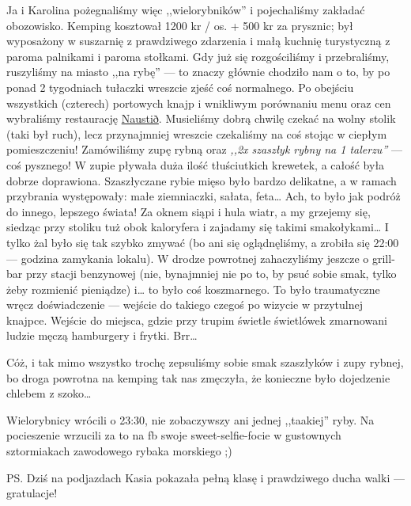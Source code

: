 
Ja i Karolina pożegnaliśmy więc ,,wielorybników'' i pojechaliśmy zakładać obozowisko. Kemping kosztował 1200 kr / os. + 500 kr za prysznic; był wyposażony w suszarnię z prawdziwego zdarzenia i małą kuchnię turystyczną z paroma palnikami i paroma stołkami. Gdy już się rozgościliśmy i przebraliśmy, ruszyliśmy na miasto ,,na rybę'' --- to znaczy głównie chodziło nam o to, by po ponad 2 tygodniach tułaczki wreszcie zjeść coś normalnego. Po obejściu wszystkich (czterech) portowych knajp i wnikliwym porównaniu menu oraz cen wybraliśmy restaurację \href{https://www.facebook.com/naustid}{Naustið}. Musieliśmy dobrą chwilę czekać na wolny stolik (taki był ruch), lecz przynajmniej wreszcie czekaliśmy na coś stojąc w ciepłym pomieszczeniu! Zamówiliśmy zupę rybną oraz \emph{,,2x szaszłyk rybny na 1 talerzu''} --- coś pysznego! W zupie pływała duża ilość tłuściutkich krewetek, a całość była dobrze doprawiona. Szaszłyczane rybie mięso było bardzo delikatne, a w ramach przybrania występowały: małe ziemniaczki, sałata, feta… Ach, to było jak podróż do innego, lepszego świata! Za oknem siąpi i hula wiatr, a my grzejemy się, siedząc przy stoliku tuż obok kaloryfera i zajadamy się takimi smakołykami… I tylko żal było się tak szybko zmywać (bo ani się oglądnęliśmy, a zrobiła się 22:00 --- godzina zamykania lokalu). W drodze powrotnej zahaczyliśmy jeszcze o grill-bar przy stacji benzynowej (nie, bynajmniej nie po to, by psuć sobie smak, tylko żeby rozmienić pieniądze) i… to było coś koszmarnego. To było traumatyczne wręcz doświadczenie --- wejście do takiego czegoś po wizycie w przytulnej knajpce. Wejście do miejsca, gdzie przy trupim świetle świetlówek zmarnowani ludzie męczą hamburgery i frytki. Brr…


Cóż, i tak mimo wszystko trochę zepsuliśmy sobie smak szaszłyków i zupy rybnej, bo droga powrotna na kemping tak nas zmęczyła, że konieczne było dojedzenie chlebem z szoko…

Wielorybnicy wrócili o 23:30, nie zobaczywszy ani jednej ,,taakiej'' ryby. Na pocieszenie wrzucili za to na fb swoje sweet-selfie-focie w gustownych sztormiakach zawodowego rybaka morskiego ;)

PS. Dziś na podjazdach Kasia pokazała pełną klasę i prawdziwego ducha walki --- gratulacje!
